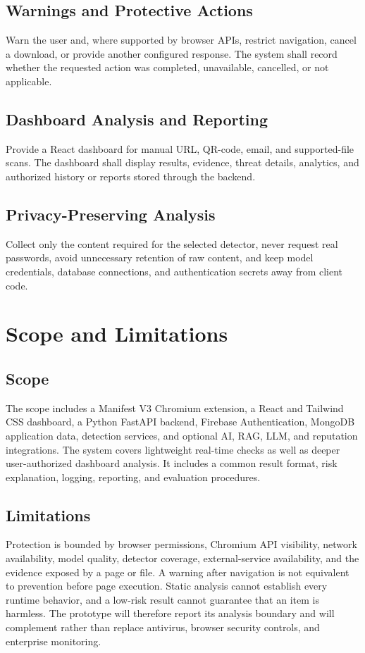 \subsection{Warnings and Protective Actions}
Warn the user and, where supported by browser APIs, restrict navigation, cancel a
download, or provide another configured response. The system shall record whether
the requested action was completed, unavailable, cancelled, or not applicable.

\subsection{Dashboard Analysis and Reporting}
Provide a React dashboard for manual URL, QR-code, email, and supported-file scans.
The dashboard shall display results, evidence, threat details, analytics, and
authorized history or reports stored through the backend.

\subsection{Privacy-Preserving Analysis}
Collect only the content required for the selected detector, never request real
passwords, avoid unnecessary retention of raw content, and keep model credentials,
database connections, and authentication secrets away from client code.

\section{Scope and Limitations}
\subsection{Scope}
The scope includes a Manifest V3 Chromium extension, a React and Tailwind CSS
dashboard, a Python FastAPI backend, Firebase Authentication, MongoDB application
data, detection services, and optional AI, RAG, LLM, and reputation integrations.
The system covers lightweight real-time checks as well as deeper user-authorized
dashboard analysis. It includes a common result format, risk explanation, logging,
reporting, and evaluation procedures.

\subsection{Limitations}
Protection is bounded by browser permissions, Chromium API visibility, network
availability, model quality, detector coverage, external-service availability, and
the evidence exposed by a page or file. A warning after navigation is not equivalent
to prevention before page execution. Static analysis cannot establish every runtime
behavior, and a low-risk result cannot guarantee that an item is harmless. The
prototype will therefore report its analysis boundary and will complement rather
than replace antivirus, browser security controls, and enterprise monitoring.

